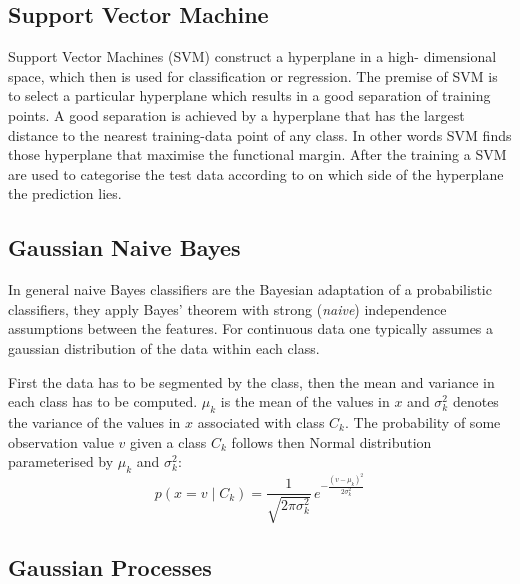 \documentclass[a4paper,11pt]{article}
\begin{document}
\subsection*{Support Vector Machine}

Support Vector Machines (SVM) construct a hyperplane in a high- dimensional space, which then is  used for classification or regression. The premise of SVM is to select a particular hyperplane which results in a  good separation of training points. A good separation is achieved by a hyperplane that has the largest distance to the nearest training-data point of any class. In other words SVM finds those hyperplane that maximise the  functional margin. After the training a SVM are used to categorise the test data according to on which side of the hyperplane the prediction lies.

\subsection*{Gaussian Naive Bayes}

In general naive Bayes classifiers are the Bayesian adaptation of a probabilistic classifiers, they apply Bayes' theorem with strong (\textit{naive}) independence assumptions between the features.
For continuous data one typically assumes a gaussian distribution of the data within each class.

First the data has to be segmented by the class, then the mean and variance in each class has to be computed. $ \mu _{k}$ is the mean of the values in $x$ and  $ \sigma _{k}^{2}$ denotes the variance of the values in $x$ associated with class $C_k$.
The probability of some observation value $v$ given a class $C_{k}$ follows then Normal distribution parameterised by $\mu _{k}$ and $\sigma _{k}^{2}$:
$$  p(x=v\mid C_{k})={\frac {1}{\sqrt {2\pi \sigma _{k}^{2}}}}\,e^{-{\frac {(v-\mu _{k})^{2}}{2\sigma _{k}^{2}}}} $$

\subsection*{Gaussian Processes}
\end{document}
